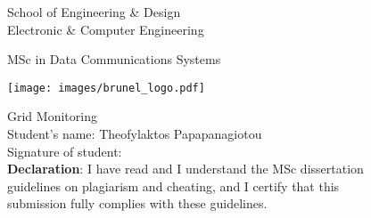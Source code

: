 \thispagestyle{empty}

\begin{center}
\Large
School of Engineering \& Design\\
Electronic \& Computer Engineering\\
\vspace{1\baselineskip}

MSc in Data Communications Systems\\
\vspace{1\baselineskip}

\begin{center}
\texttt{[image: images/brunel\_logo.pdf]}\\
\end{center}
\vspace{0.5\baselineskip}

\Huge
Grid Monitoring\\
\vspace{2\baselineskip}
\Large
Student's name: Theofylaktos Papapanagiotou \\
Signature of student: \\

\vspace{1.8\baselineskip}
\large
{\bf Declaration}: I have read and I understand the MSc dissertation\\
guidelines on plagiarism and cheating, and I certify that this\\
submission fully complies with these guidelines.
\end{center}